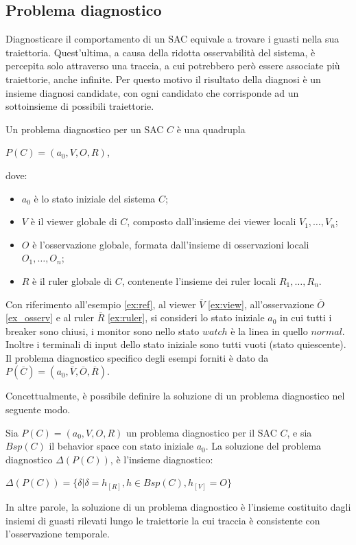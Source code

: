 \subsection{Problema diagnostico}
Diagnosticare il comportamento di un SAC equivale a trovare i guasti nella sua traiettoria. Quest'ultima, a causa della ridotta osservabilità del sistema, è percepita solo attraverso una traccia, a cui potrebbero però essere associate più traiettorie, anche infinite. Per questo motivo il risultato della diagnosi è un insieme diagnosi candidate, con ogni candidato che corrisponde ad un sottoinsieme di possibili traiettorie. 
\begin{defn}
Un problema diagnostico per un SAC $C$ è una quadrupla
\begin{center}
$P(C) = (a_0,V,O,R)$,
\end{center}
dove:
\begin{itemize}
\item $a_0$ è lo stato iniziale del sistema $C$;
\item $V$ è il viewer globale di $C$, composto dall'insieme dei viewer locali $V_1, \ldots, V_n$;
\item $O$ è l'osservazione globale, formata dall'insieme di osservazioni locali $O_1, \ldots, O_n$;
\item $R$ è il ruler globale di $C$, contenente l'insieme dei ruler locali $R_1, \ldots, R_n$.
\end{itemize}
\end{defn}

\begin{ex} \label{ex:prob_diagn}
Con riferimento all'esempio \ref{ex:ref}, al viewer $\overline{V}$ \ref{ex:view}, all'osservazione $\overline{O}$ \ref{ex_osserv} e al ruler $\overline{R}$ \ref{ex:ruler}, si consideri lo stato iniziale $a_0$ in cui tutti i breaker sono chiusi, i monitor sono nello stato $watch$ è la linea in quello $normal$. Inoltre i terminali di input dello stato iniziale sono tutti vuoti (stato quiescente).
Il problema diagnostico specifico degli esempi forniti è dato da $P(\overline{C}) = (a_0,\overline{V},\overline{O},\overline{R})$.
\end{ex}

Concettualmente, è possibile definire la soluzione di un problema diagnostico nel seguente modo.
\begin{defn}
Sia $P(C) = (a_0,V,O,R)$ un problema diagnostico per il SAC $C$, e sia $Bsp(C)$ il behavior space con stato iniziale $a_0$. La soluzione del problema diagnostico $\Delta(P(C))$, è l'insieme diagnostico:
\begin{center}
	$\Delta(P(C)) = \{ \delta | \delta = h_{[R]}, h \in Bsp(C), h_{[V]} = O\}$
\end{center}
\end{defn}
In altre parole, la soluzione di un problema diagnostico è l'insieme costituito dagli insiemi di guasti rilevati lungo le traiettorie la cui traccia è consistente con l'osservazione temporale.


